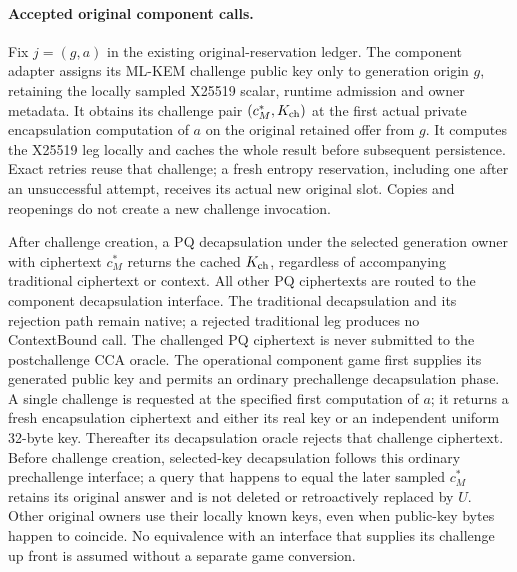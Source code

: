 \paragraph{Accepted original component calls.}
Fix $j=(g,a)$ in the existing original-reservation ledger. The component
adapter assigns its ML-KEM challenge public key only to generation origin
$g$, retaining the locally sampled X25519 scalar, runtime admission and
owner metadata. It obtains its challenge pair $(c_M^*,K_{\rm ch})$ at the
first actual private encapsulation computation of $a$ on the original
retained offer from $g$. It computes the X25519 leg locally and caches the
whole result before subsequent persistence. Exact retries reuse that
challenge; a fresh entropy reservation, including one after an unsuccessful
attempt, receives its actual new original slot. Copies and reopenings do
not create a new challenge invocation.

After challenge creation, a PQ decapsulation under the selected generation
owner with ciphertext $c_M^*$ returns the cached $K_{\rm ch}$, regardless
of accompanying traditional ciphertext or context. All other PQ
ciphertexts are routed to the component decapsulation interface. The
traditional decapsulation and its rejection path remain native; a rejected
traditional leg produces no ContextBound call. The challenged PQ
ciphertext is never submitted to the postchallenge CCA oracle. The operational component game first supplies its generated public key
and permits an ordinary prechallenge decapsulation phase. A single
challenge is requested at the specified first computation of $a$; it
returns a fresh encapsulation ciphertext and either its real key or an
independent uniform 32-byte key. Thereafter its decapsulation oracle
rejects that challenge ciphertext. Before challenge creation, selected-key
decapsulation follows this ordinary prechallenge interface; a query that
happens to equal the later sampled $c_M^*$ retains its original answer
and is not deleted or retroactively replaced by $U$. Other original
owners use their locally known keys, even when public-key bytes happen
to coincide. No equivalence with an interface that supplies its challenge
up front is assumed without a separate game conversion.

